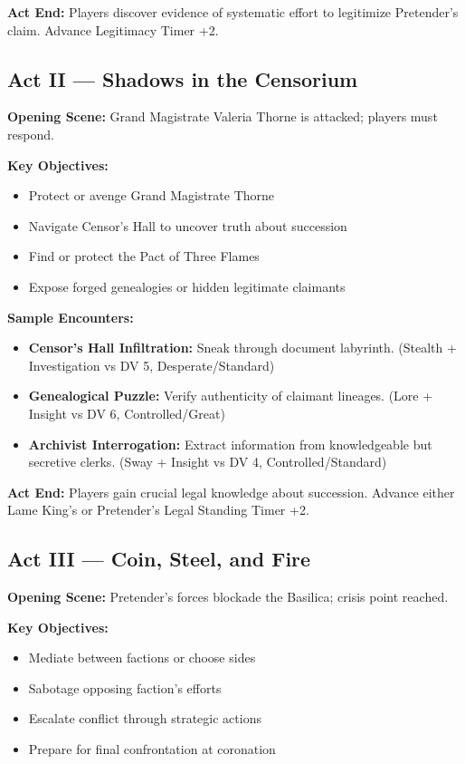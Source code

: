 \documentclass[11pt]{article}
\begin{document}
\textbf{Act End:} Players discover evidence of systematic effort to legitimize Pretender's claim. Advance Legitimacy Timer +2.

\subsection{Act II --- Shadows in the Censorium}

\textbf{Opening Scene:} Grand Magistrate Valeria Thorne is attacked; players must respond.

\textbf{Key Objectives:}
\begin{itemize}
\item Protect or avenge Grand Magistrate Thorne
\item Navigate Censor's Hall to uncover truth about succession
\item Find or protect the Pact of Three Flames
\item Expose forged genealogies or hidden legitimate claimants
\end{itemize}

\textbf{Sample Encounters:}
\begin{itemize}
\item \textbf{Censor's Hall Infiltration:} Sneak through document labyrinth. (Stealth + Investigation vs DV 5, Desperate/Standard)
\item \textbf{Genealogical Puzzle:} Verify authenticity of claimant lineages. (Lore + Insight vs DV 6, Controlled/Great)
\item \textbf{Archivist Interrogation:} Extract information from knowledgeable but secretive clerks. (Sway + Insight vs DV 4, Controlled/Standard)
\end{itemize}

\textbf{Act End:} Players gain crucial legal knowledge about succession. Advance either Lame King's or Pretender's Legal Standing Timer +2.

\subsection{Act III --- Coin, Steel, and Fire}

\textbf{Opening Scene:} Pretender's forces blockade the Basilica; crisis point reached.

\textbf{Key Objectives:}
\begin{itemize}
\item Mediate between factions or choose sides
\item Sabotage opposing faction's efforts
\item Escalate conflict through strategic actions
\item Prepare for final confrontation at coronation
\end{itemize}
\end{document}
